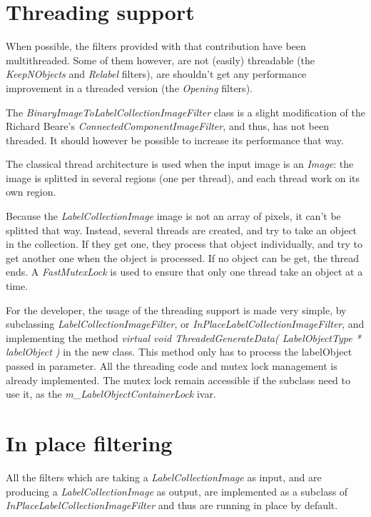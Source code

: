 \documentclass{InsightArticle}
\begin{document}
\section{Threading support}

When possible, the filters provided with that contribution have been multithreaded.
Some of them however, are not (easily) threadable (the {\em KeepNObjects} and {\em Relabel}
filters), are shouldn't get any performance improvement in a threaded version
(the {\em Opening} filters).

The {\em BinaryImageToLabelCollectionImageFilter} class is a slight modification of the
Richard Beare's {\em ConnectedComponentImageFilter}, and thus, has not been threaded.
It should however be possible to increase its performance that way.

The classical thread architecture is used when the input image is an {\em Image}: the image
is splitted in several regions (one per thread), and each thread work on its own region.

Because the {\em LabelCollectionImage} image is not an array of pixels, it can't be splitted
that way. Instead, several threads are created, and try to take an object in the collection.
If they get one, they process that object individually, and try to get another one when the
object is processed. If no object can be get, the thread ends. A {\em FastMutexLock} is used
to ensure that only one thread take an object at a time.

For the developer, the usage of the threading support is made very simple, by subclassing
{\em LabelCollectionImageFilter}, or {\em InPlaceLabelCollectionImageFilter}, and implementing
the method {\em virtual void ThreadedGenerateData( LabelObjectType * labelObject )} in the
new class. This method only has to process the labelObject passed in parameter. All the
threading code and mutex lock management is already implemented. The mutex lock remain
accessible if the subclass need to use it, as the {\em m\_LabelObjectContainerLock} ivar.

\section{In place filtering}

All the filters which are taking a {\em LabelCollectionImage} as input, and are producing a {\em LabelCollectionImage} as output, are implemented as a subclass of {\em InPlaceLabelCollectionImageFilter} and
thus are running in place by default.
\end{document}
